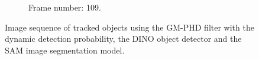 \begin{figure}[H]
\begin{subfigure}{0.48\textwidth}
        \caption{Frame number: 109.}
        \label{fig:E1-V2-S3:06}
    \end{subfigure}
    \caption{Image sequence of tracked objects using the GM-PHD filter with the dynamic detection probability, the DINO
    object detector and the SAM image segmentation model.}
    \label{fig:E1-V2-S3}
\end{figure}
